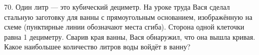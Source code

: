 70. Один литр --- это кубический дециметр. На уроке труда Вася сделал стальную заготовку для ванны с прямоугольным основанием, изображённую на схеме (пунктирные линии обозначают места сгиба). Сторона одной клеточки равна 1 дециметру. Сварив края ванны, Вася обнаружил, что она вышла кривая. Какое наибольшее количество литров воды войдёт в ванну?
\begin{center}
\begin{figure}[ht!]
\end{figure}
\end{center}
\newpage
\noindent
